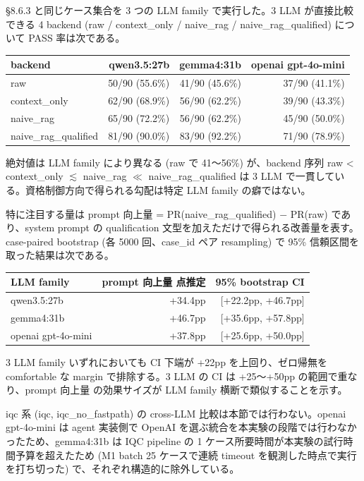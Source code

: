 \documentclass[12pt,a4paper]{article}
\begin{document}
\S8.6.3 と同じケース集合を 3 つの LLM family で実行した。3 LLM が直接比較できる 4 backend (raw / context\_only / naive\_rag / naive\_rag\_qualified) について PASS 率は次である。

{\def\LTcaptype{table}
\begin{longtable}[]{@{}lrrr@{}}
\toprule\noalign{}
backend & qwen3.5:27b & gemma4:31b & openai gpt-4o-mini \\
\midrule\noalign{}
\endhead
\bottomrule\noalign{}
\endlastfoot
raw & 50/90 (55.6\%) & 41/90 (45.6\%) & 37/90 (41.1\%) \\
context\_only & 62/90 (68.9\%) & 56/90 (62.2\%) & 39/90 (43.3\%) \\
naive\_rag & 65/90 (72.2\%) & 56/90 (62.2\%) & 45/90 (50.0\%) \\
naive\_rag\_qualified & 81/90 (90.0\%) & 83/90 (92.2\%) & 71/90 (78.9\%) \\
\end{longtable}
}

絶対値は LLM family により異なる (raw で 41〜56\%) が、backend 序列 raw < context\_only $\lesssim$ naive\_rag $\ll$ naive\_rag\_qualified は 3 LLM で一貫している。資格制御方向で得られる勾配は特定 LLM family の癖ではない。

特に注目する量は prompt 向上量 = PR(naive\_rag\_qualified) $-$ PR(raw) であり、system prompt の qualification 文型を加えただけで得られる改善量を表す。case-paired bootstrap (各 5000 回、case\_id ペア resampling) で 95\% 信頼区間を取った結果は次である。

{\def\LTcaptype{table}
\begin{longtable}[]{@{}lrr@{}}
\toprule\noalign{}
LLM family & prompt 向上量 点推定 & 95\% bootstrap CI \\
\midrule\noalign{}
\endhead
\bottomrule\noalign{}
\endlastfoot
qwen3.5:27b & +34.4pp & [+22.2pp, +46.7pp] \\
gemma4:31b & +46.7pp & [+35.6pp, +57.8pp] \\
openai gpt-4o-mini & +37.8pp & [+25.6pp, +50.0pp] \\
\end{longtable}
}

3 LLM family いずれにおいても CI 下端が +22pp を上回り、ゼロ帰無を comfortable な margin で排除する。3 LLM の CI は +25〜+50pp の範囲で重なり、prompt 向上量 の効果サイズが LLM family 横断で類似することを示す。

iqc 系 (iqc, iqc\_no\_fastpath) の cross-LLM 比較は本節では行わない。openai gpt-4o-mini は agent 実装側で OpenAI を選ぶ統合を本実験の段階では行わなかったため、gemma4:31b は IQC pipeline の 1 ケース所要時間が本実験の試行時間予算を超えたため (M1 batch 25 ケースで連続 timeout を観測した時点で実行を打ち切った) で、それぞれ構造的に除外している。
\end{document}
